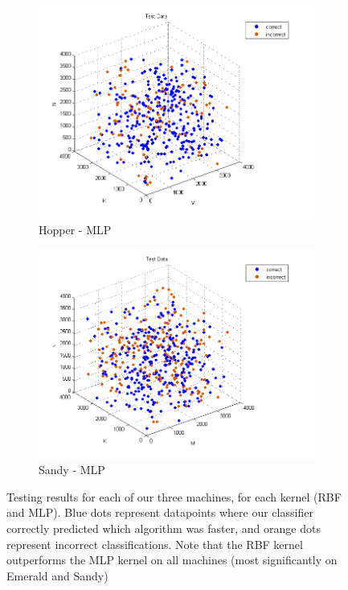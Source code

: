 \begin{figure}[t]
\begin{subfigure}[t]{0.33\textwidth}
            \includegraphics[width=\textwidth]{figures/hopper_test_mlp.png}
            \caption{Hopper - MLP}
            \label{f:classify_mlp_hopper}
        \end{subfigure}
        \begin{subfigure}[t]{0.33\textwidth}
            \includegraphics[width=\textwidth]{figures/sandy_test_mlp.png}
            \caption{Sandy - MLP}
            \label{f:classify_mlp_sandy}
        \end{subfigure}
        
        \caption{Testing results for each of our three machines, for each kernel (RBF and MLP). Blue dots represent datapoints where our classifier correctly predicted which algorithm was faster, and orange dots represent incorrect classifications. Note that the RBF kernel outperforms the MLP kernel on all machines (most significantly on Emerald and Sandy)}
    \label{fig:classifying}
\end{figure}

